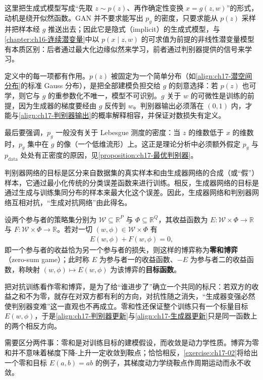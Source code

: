 \documentclass[../../main.tex]{subfiles}
\begin{document}
\begin{remark}
这里把生成式模型写成“先取 $z\sim p(z)$、再作确定性变换 $x=g(z,w)$”的形式，动机是绕开似然函数。GAN 并不要求能写出 $p_g$ 的密度，只要求能从 $p(z)$ 采样并把样本经 $g$ 推送出去；因此它是隐式（implicit）的生成式模型，与\cref{chapter:ch16-连续潜变量}中以 $p(x\mid z,w)$ 的可求值为前提的非线性潜变量模型有本质区别：后者通过最大化边缘似然来学习，前者通过判别器提供的信号来学习。

定义中的每一项都有作用。$p(z)$ 被固定为一个简单分布（如\eqref{align:ch17-潜空间分布}的标准 Gauss 分布），是把全部建模负担交给 $g$ 的刻意选择：若 $p(z)$ 也可学，则它与 $g$ 的重参数化不唯一，模型不可识别。$g$ 关于 $w$ 的可微性是训练的前提，因为生成器的梯度要经由 $g$ 反传到 $w$。判别器输出必须落在 $(0,1)$ 内，才能与\eqref{align:ch17-判别器输出}的概率解释相容，并保证对数损失有定义。

最后要强调，$p_g$ 一般没有关于 Lebesgue 测度的密度：当 $z$ 的维数低于 $x$ 的维数时，$p_g$ 集中在 $g$ 的像（一个低维流形）上。这正是理论分析中必须额外假定 $p_g$ 与 $p_{\mathrm{data}}$ 处处有正密度的原因，见\cref{proposition:ch17-最优判别器}。
\end{remark}

判别器网络的目标是区分来自数据集的真实样本和由生成器网络的合成（或“假”）样本，它通过最小化传统的分类误差函数来进行训练。相反，生成器网络的目标是通过生成与训练集同分布的样本来最大化这个误差。因此，生成器网络和判别器网络互相对抗，“生成对抗网络”由此得名。

\begin{definition}[零和博弈]\label{definition:ch17-零和博弈}
设两个参与者的策略集分别为 $\mathcal{W}\subseteq\mathbb{R}^{P}$ 与 $\Phi\subseteq\mathbb{R}^{Q}$，其收益函数为 $E:\mathcal{W}\times\Phi\to\mathbb{R}$ 与 $F:\mathcal{W}\times\Phi\to\mathbb{R}$。若对一切 $(w,\phi)\in\mathcal{W}\times\Phi$ 有
\begin{align*}
E(w,\phi)+F(w,\phi)=0,
\end{align*}
即一个参与者的收益恰为另一个参与者的损失，则这样的博弈称为\textbf{零和博弈}（zero-sum game）；此时称 $E$ 为参与者一的收益函数、$-E$ 为参与者二的收益函数，称映射 $(w,\phi)\mapsto E(w,\phi)$ 为该博弈的\textbf{目标函数}。
\end{definition}

\begin{remark}
把对抗训练看作零和博弈，是为了给“谁进步了”确立一个共同的标尺：若双方的收益之和不为零，就存在对双方都有利的方向，对抗性随之消失，“生成器变强必然使判别器变难”这一直观也不再成立。零和性还保证整个训练只有一个标量目标 $E(w,\phi)$，于是\eqref{align:ch17-判别器更新}与\eqref{align:ch17-生成器更新}只是同一函数上的两个相反方向。

需要区分两件事：零和是对训练目标的建模假设，而收敛是动力学性质。博弈为零和并不意味着梯度下降-上升一定收敛到鞍点；恰恰相反，\cref{exercise:ch17-02}将给出一个零和目标 $E(a,b)=ab$ 的例子，其梯度动力学绕鞍点作周期运动而永不收敛。
\end{remark}
\end{document}
